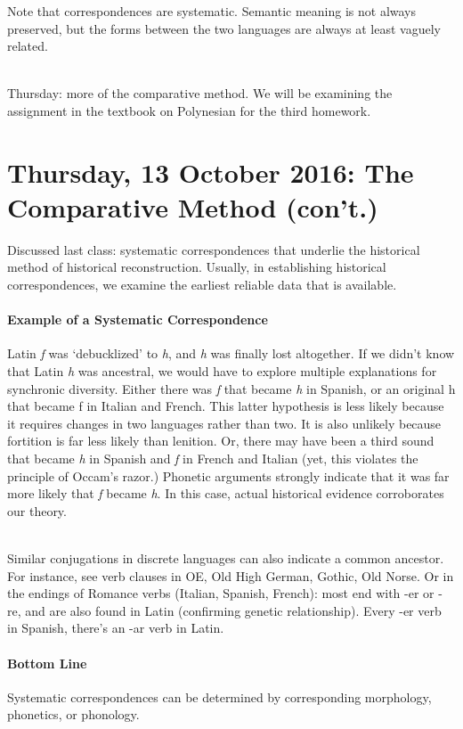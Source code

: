 \documentclass{exam}
\begin{document}
Note that correspondences are systematic. Semantic meaning is not always preserved, but the forms between the two languages are always at least vaguely related.

\noindent \\Thursday: more of the comparative method. We will be examining the assignment in the textbook on Polynesian for the third homework.



\section*{Thursday, 13 October 2016: The Comparative Method (con't.) }

Discussed last class: systematic correspondences that underlie the historical method of historical reconstruction. 
Usually, in establishing historical correspondences, we examine the earliest reliable data that is available.  


\paragraph{Example of a Systematic Correspondence} Latin \textit{f} was `debucklized' to \textit{h}, and \textit{h} was finally lost altogether. If we didn't know that Latin \textit{h} was ancestral, we would have to explore multiple explanations for synchronic diversity. Either there was \textit{f} that became \textit{h} in Spanish, or an original h that became f in Italian and French. This latter hypothesis is less likely because it requires changes in two languages rather than two. It is also unlikely because fortition is far less likely than lenition. Or, there may have been a third sound that became \textit{h} in Spanish and \textit{f} in French and Italian (yet, this violates the principle of Occam's razor.) Phonetic arguments strongly indicate that it was far more likely that \textit{f} became \textit{h}. In this case, actual historical evidence corroborates our theory. 

\noindent \\Similar conjugations in discrete languages can also indicate a common ancestor. For instance, see verb clauses in OE, Old High German, Gothic, Old Norse. Or in the endings of Romance verbs (Italian, Spanish, French): most end with -er or -re, and are also found in Latin (confirming genetic relationship). Every -er verb in Spanish, there's an -ar verb in Latin. 

\paragraph{Bottom Line} Systematic correspondences can be determined by corresponding morphology, phonetics, or phonology.
\end{document}
